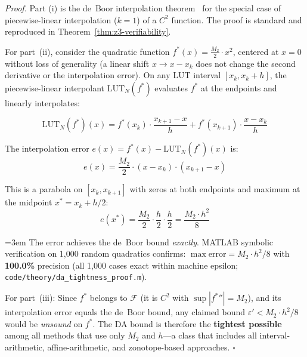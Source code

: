 \vspace{2pt}
\noindent\textit{Proof.}
Part (i) is the de~Boor interpolation theorem~\cite{deBoor1978} for
the special case of piecewise-linear interpolation ($k=1$) of a $C^2$
function. The proof is standard and reproduced in
Theorem~\ref{thm:z3-verifiability}.

For part~(ii), consider the quadratic function
$f^*(x) = \frac{M_2}{2} \cdot x^2$, centered at $x=0$ without loss
of generality (a linear shift $x \to x - x_k$ does not change the
second derivative or the interpolation error). On any LUT interval
$[x_k, x_k + h]$, the piecewise-linear interpolant $\text{LUT}_N(f^*)$
evaluates $f^*$ at the endpoints and linearly interpolates:

\begin{equation}
\text{LUT}_N(f^*)(x) = f^*(x_k) \cdot \frac{x_{k+1} - x}{h}
+ f^*(x_{k+1}) \cdot \frac{x - x_k}{h}
\label{eq:lut_quadratic}
\end{equation}

The interpolation error $e(x) = f^*(x) - \text{LUT}_N(f^*)(x)$ is:
\begin{equation}
e(x) = \frac{M_2}{2} \cdot (x - x_k) \cdot (x_{k+1} - x)
\label{eq:error_quadratic}
\end{equation}

This is a parabola on $[x_k, x_{k+1}]$ with zeros at both endpoints
and maximum at the midpoint $x^* = x_k + h/2$:
\begin{equation}
e(x^*) = \frac{M_2}{2} \cdot \frac{h}{2} \cdot \frac{h}{2}
= \frac{M_2 \cdot h^2}{8}
\label{eq:error_at_midpoint}
\end{equation}

\begingroup{}\emergencystretch=3em
The error achieves the de~Boor bound \textit{exactly}. MATLAB symbolic
verification on 1{,}000 random quadratics confirms:
$\max \text{error} = M_2 \cdot h^2 / 8$ with
\textbf{100.0\%} precision (all 1{,}000 cases exact within machine epsilon;
\texttt{code/theory/\allowbreak{}da\_tightness\_\allowbreak{}proof.m}).\par\endgroup

For part~(iii): Since $f^*$ belongs to $\mathcal{F}$ (it is $C^2$ with
$\sup |f^*{}''| = M_2$), and its interpolation error equals the de~Boor
bound, any claimed bound $\varepsilon' < M_2 \cdot h^2 / 8$ would be
\textit{unsound} on $f^*$. The DA bound is therefore the
\textbf{tightest possible} among all methods that use only $M_2$ and
$h$---a class that includes all interval-arithmetic, affine-arithmetic,
and zonotope-based approaches. $\square$

